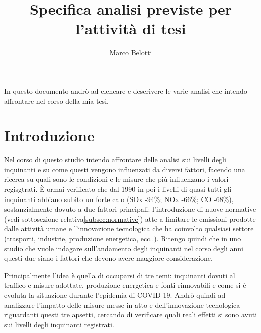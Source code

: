 \documentclass{article}
\title{Specifica analisi previste per l'attività di tesi}
\author{Marco Belotti}
\begin{document}
\maketitle
\tableofcontents
\listoftodos
\newpage

In questo documento andrò ad elencare e descrivere le varie analisi che intendo affrontare nel corso della mia tesi. 


\section{Introduzione}
Nel corso di questo studio intendo affrontare delle analisi sui livelli degli inquinanti e su come questi vengono influenzati da diversi fattori, facendo una ricerca su quali sono le condizioni e le misure che più influenzano i valori regisgtrati. È ormai verificato che dal 1990 in poi i livelli di quasi tutti gli inquinanti abbiano subito un forte calo (SOx -94\%; NOx -66\%; CO -68\%)\cite{iir2020}, sostanzialmente dovuto a due fattori principali: l'introduzione di nuove normative (vedi sottosezione relativa\ref{subsec:normative})
atte a limitare le emissioni prodotte dalle attività umane e l'innovazione tecnologica che ha coinvolto qualsiasi settore (trasporti, industrie, produzione energetica, ecc..). Ritengo quindi che in uno studio che vuole indagare sull'andamento degli inquinanti nel corso degli anni questi due siano i fattori che devono avere maggiore considerazione.

Principalmente l'idea è quella di occuparsi di tre temi: inquinanti dovuti al traffico e misure adottate, produzione energetica e fonti rinnovabili e come si è evoluta la situazione durante l'epidemia di COVID-19. Andrò quindi ad analizzare l'impatto delle misure messe in atto e dell'innovazione tecnologica riguardanti questi tre apsetti, cercando di verificare quali reali effetti si sono avuti sui livelli degli inquinanti registrati.
\end{document}
